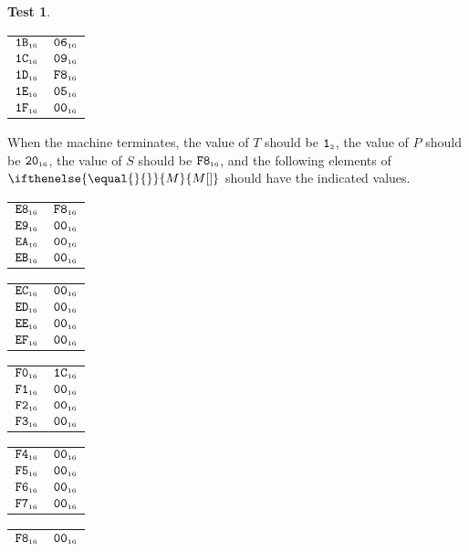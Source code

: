 \documentclass[a4paper,12pt]{article}
\makeatletter
\newcommand{\num}[1]{\texttt{#1}}
\newcommand{\hex}[1]{\num{#1}_{\textup{\tiny 16}}}
\newcommand{\bin}[1]{\num{#1}_{\textup{\tiny 2}}}
\newcommand{\MEM}[1]{\ifthenelse{\equal{#1}{}}{M}{M[#1]}}
\newcommand{\PC}{P}
\newcommand{\SP}{S}
\newcommand{\TERM}{T}
\newcommand{\T}{\bin{1}}
\theoremstyle{definition}
\newtheorem{test}{Test}
\newenvironment{memtable}{%
  \begin{trivlist}
    \item
    }{%
    \end{trivlist}}
\newenvironment{memcolumn}{%
  \begin{tabular}{@{}ll@{}}
    \hline}
    {%
    \hline
  \end{tabular}}
\newcommand{\memspace}{\qquad}
\makeatother
\begin{document}
\begin{test}
\begin{memtable}
\begin{memcolumn}
      $\hex{1B}$ & $\hex{06}$ \\
      $\hex{1C}$ & $\hex{09}$ \\
      $\hex{1D}$ & $\hex{F8}$ \\
      $\hex{1E}$ & $\hex{05}$ \\
      $\hex{1F}$ & $\hex{00}$ \\
    \end{memcolumn}
  \end{memtable}
  When the machine terminates, the value of $\TERM$ should be $\T$, the value of $\PC$ should be $\hex{20}$, the value of $\SP$ should be $\hex{F8}$, and the following elements of $\MEM{}$ should have the indicated values.
  \begin{memtable}
    \begin{memcolumn}
      $\hex{E8}$ & $\hex{F8}$ \\
      $\hex{E9}$ & $\hex{00}$ \\
      $\hex{EA}$ & $\hex{00}$ \\
      $\hex{EB}$ & $\hex{00}$ \\
    \end{memcolumn}
    \memspace
    \begin{memcolumn}
      $\hex{EC}$ & $\hex{00}$ \\
      $\hex{ED}$ & $\hex{00}$ \\
      $\hex{EE}$ & $\hex{00}$ \\
      $\hex{EF}$ & $\hex{00}$ \\
    \end{memcolumn}
    \memspace
    \begin{memcolumn}
      $\hex{F0}$ & $\hex{1C}$ \\
      $\hex{F1}$ & $\hex{00}$ \\
      $\hex{F2}$ & $\hex{00}$ \\
      $\hex{F3}$ & $\hex{00}$ \\
    \end{memcolumn}
    \memspace
    \begin{memcolumn}
      $\hex{F4}$ & $\hex{00}$ \\
      $\hex{F5}$ & $\hex{00}$ \\
      $\hex{F6}$ & $\hex{00}$ \\
      $\hex{F7}$ & $\hex{00}$ \\
    \end{memcolumn}
    \memspace
    \begin{memcolumn}
      $\hex{F8}$ & $\hex{00}$ \\

\end{memcolumn}
\end{memtable}
\end{test}
\end{document}
